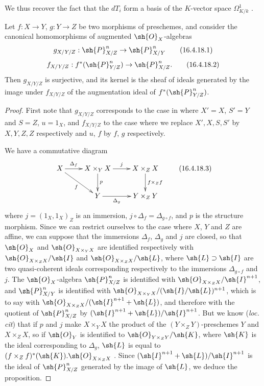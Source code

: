 We thus recover the fact that the $dT_i$ form a basis of the $K$-vector space $\Omega_{K/k}^1$ .

\begin{env}[16.4.18]
\label{IV.16.4.18}
Let $f:X \to Y$, $g:Y \to Z$ be two morphisms of preschemes, and consider the canonical homomorphisms of augmented $\sh{O}_X$-algebras 
\[
  \label{IV.16.4.18.1}
  g_{X/Y/Z}:\sh{P}_{X/Z}^n \to \sh{P}_{X/Y}^n
  \tag{16.4.18.1}
\]
\[
  \label{IV.16.4.18.2}
  f_{X/Y/Z}:f^*(\sh{P}_{Y/Z}^n) \to \sh{P}_{X/Z}^n.
  \tag{16.4.18.2}
\]
Then $g_{X/Y/Z}$ is surjective, and its kernel is the sheaf of ideals generated by the image under $f_{X/Y/Z}$ of the augmentation ideal of $f^*(\sh{P}_{Y/Z}^n)$.
\end{env}

\begin{proof}
First note that $g_{X/Y/Z}$ corresponds to the case in  where $X' = X$, $S' = Y$ and $S = Z$, $u = 1_X$, and $f_{X/Y/Z}$ to the case where we replace $X', X, S, S'$ by $X, Y, Z, Z$ respectively and $u$, $f$ by $f$, $g$ respectively.

We have a commutative diagram 
\[
  \label{IV.16.4.18.3}
  \xymatrix{
    X \ar[r]^-{\Delta_f} \ar[dr]_-f & X \times_Y X \ar[d]^-p \ar[r]^-j & X \times_Z X \ar[d]^-{f \times_Z f} \\
    &   Y \ar[r]_-{\Delta_g}  & Y \times_Z Y
  }
  \tag{16.4.18.3}
\] 
where $j = (1_X, 1_X)_Z$ is an immersion, $j \circ \Delta_f = \Delta_{g \circ f}$, and $p$ is the structure morphism.
Since we can restrict ourselves to the case where $X$, $Y$ and $Z$ are affine, we can suppose that the immersions $\Delta_f$, $\Delta_g$ and $j$ are closed, so that $\sh{O}_X$ and $\sh{O}_{X \times_Y X}$ are identified respectively with $\sh{O}_{X \times_Z X} / \sh{I}$ and $\sh{O}_{X \times_Z X}/\sh{L}$, where $\sh{L} \supset \sh{I}$ are two quasi-coherent ideals corresponding respectively to the immersions $\Delta_{g \circ f} $ and $j$.
The $\sh{O}_X$-algebra $\sh{P}_{X/Z}^n$ is identified with $\sh{O}_{X \times_Z X} / \sh{I}^{n+1}$, and $\sh{P}_{X/Y}^n$ is identified with $\sh{O}_{X \times_Y X}/(\sh{I}/\sh{L})^{n+1}$, which is to say with $\sh{O}_{X \times_Z X}/(\sh{I}^{n+1} + \sh{L})$, and therefore with the quotient of $\sh{P}_{X/Z}^n$ by $(\sh{I}^{n+1} + \sh{L})/\sh{I}^{n+1}$.
But we know (\emph{loc. cit}) that if $p$ and $j$ make $X \times_Y X$ the product of the $(Y \times_Z Y)$-preschemes $Y$ and $X \times_Z X$, so if $\sh{O}_Y$ is identified to $\sh{O}_{Y \times_Z Y}/\sh{K}$, where $\sh{K}$ is the ideal corresponding to $\Delta_g$, $\sh{L}$ is equal to $(f\times_Z f)^*(\sh{K}).\sh{O}_{X \times_Z X}$ .
Since $(\sh{I}^{n+1} + \sh{L})/\sh{I}^{n+1}$ is the ideal of $\sh{P}_{X/Z}^n$ generated by the image of $\sh{L}$, we deduce the proposition.
\end{proof}

